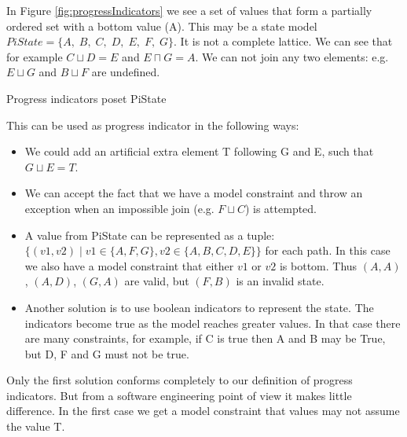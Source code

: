 In Figure \ref{fig:progressIndicators} we see a set of values that form a partially ordered set with a bottom value (A).
This may be a state model $\mathit{PiState = \{A, \; B, \; C, \; D, \; E, \; F, \; G\}}$.  
It is not a complete lattice. We can see that for example $C \sqcup D = E$ and $E \sqcap G = A$.
We can not join any two elements: e.g. $E \sqcup G$ and $B \sqcup F$ are undefined. 
 
 


\begin{Figure}
\caption{Progress indicators poset PiState}\label{fig:progressIndicators}
\end{Figure}

This can be used as progress indicator in the following ways:
\begin{itemize}
\item We could add an artificial extra element T following G and E, such that $ G \sqcup E = T$.
\item We can accept the fact that we have a model constraint and throw an exception when an impossible join (e.g. $F \sqcup C$) is attempted.
\item A value from PiState can be represented as a tuple: $\{(v1,v2) \mid v1 \in \{A, F, G\} , v2 \in \{ A,B,C,D,E\}\} $ for each path. 
In this case we also have a model constraint  that either $v1$ or $v2$ is bottom.
Thus $(A,A)$,  $(A,D)$, $(G, A)$ are valid, but $(F,B)$ is an invalid state. 
\item Another solution is to use boolean indicators to represent the state.
The indicators become true as the model reaches greater values.
In that case there are many constraints, for example,  if C is true then A and B may be True, but D, F and G must not be true.
\end{itemize}
Only the first solution conforms completely to our definition of progress indicators.
But from a software engineering point of view it makes little difference.
In the first case we get a model constraint that values may not assume the value T.

